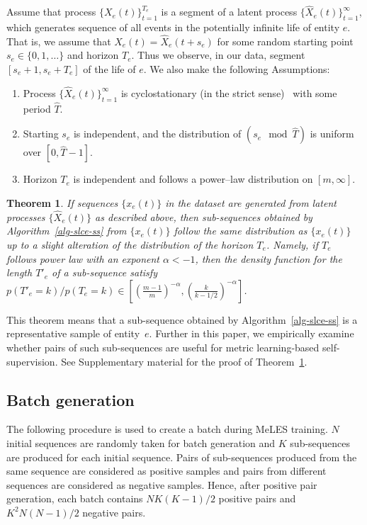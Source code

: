 \documentclass{article}
\newtheorem{thm}{Theorem}
\newcommand{\nt}[1]{{\bf [#1]}}
\begin{document}
Assume that process $\{X_e(t)\}_{t=1}^{T_e}$ is a segment of a latent process $\{\widehat{X}_e(t)\}_{t=1}^{\infty}$, which generates sequence of all events in the potentially infinite life of entity $e$. That is, we assume that $X_e(t)=\widehat{X}_e(t+s_e)$ for some random starting point $s_e\in \{0,1,\ldots\}$ and horizon $T_e$. Thus we observe, in our data, segment $[s_e+1,s_e+T_e]$ of the life of $e$. We also make the following Assumptions:
\begin{enumerate}
    \item Process $\{\widehat{X}_e(t)\}_{t=1}^{\infty}$ is cyclostationary (in the strict sense)~\cite{Gardner2006Cyclostationarity} with some period $\widehat{T}$.
    \item Starting $s_e$ is independent, and the distribution of $(s_e \mod \widehat{T})$ is uniform over $[0,\widehat{T}-1]$.
    \item Horizon $T_e$ is independent and follows a power--law distribution on $[m,\infty]$.
\end{enumerate}
\begin{thm}\label{thm:distribution}
If sequences $\{x_e(t)\}$ in the dataset are generated from latent processes $\{\widehat{X}_e(t)\}$ as described above, then sub-sequences obtained by Algorithm~\ref{alg-slce-ss} from $\{x_e(t)\}$ follow the same distribution as $\{x_e(t)\}$ up to a slight alteration of the distribution of the horizon $T_e$. Namely, if $T_e$ follows power law with an exponent $\alpha <-1$, then the density function for the length $T'_e$ of a sub-sequence satisfy $p(T'_e=k)/p(T_e=k)\in [(\frac{m-1}{m})^{-\alpha},(\frac{k}{k-1/2})^{-\alpha}]$.
\end{thm}
This theorem means that a sub-sequence obtained by Algorithm~\ref{alg-slce-ss} is a representative sample of entity~$e$. Further in this paper, we empirically examine whether pairs of such sub-sequences are useful for metric learning-based self-supervision. See Supplementary material for the proof of Theorem~\ref{thm:distribution}.

\subsection{Batch generation}

The following procedure is used to create a batch during MeLES training. $N$ initial sequences are randomly taken for batch generation and $K$ sub-sequences are produced for each initial sequence. Pairs of sub-sequences produced from the same sequence are considered as positive samples and pairs from different sequences are considered as negative samples. Hence, after positive pair generation, each batch contains %
$NK(K-1)/2$ positive pairs and $K^2N(N - 1)/2$ negative pairs.
\end{document}
